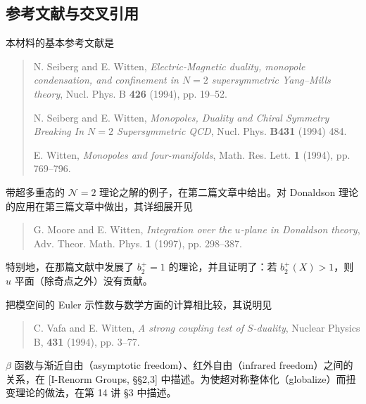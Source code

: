 
\subsection{参考文献与交叉引用}

本材料的基本参考文献是

\begin{quote}
N. Seiberg and E. Witten, \emph{Electric-Magnetic duality, monopole condensation, and confinement in $N=2$ supersymmetric Yang--Mills theory}, Nucl. Phys. B \textbf{426} (1994), pp. 19--52.

N. Seiberg and E. Witten, \emph{Monopoles, Duality and Chiral Symmetry Breaking In $N=2$ Supersymmetric QCD}, Nucl. Phys. \textbf{B431} (1994) 484.

E. Witten, \emph{Monopoles and four-manifolds}, Math. Res. Lett. \textbf{1} (1994), pp. 769--796.
\end{quote}

带超多重态的 $\mathcal{N}=2$ 理论之解的例子，在第二篇文章中给出。对 Donaldson 理论的应用在第三篇文章中做出，其详细展开见

\begin{quote}
G. Moore and E. Witten, \emph{Integration over the $u$-plane in Donaldson theory}, Adv. Theor. Math. Phys. \textbf{1} (1997), pp. 298--387.
\end{quote}

特别地，在那篇文献中发展了 $b_2^+=1$ 的理论，并且证明了：若 $b_2^+(X)>1$，则 $u$ 平面（除奇点之外）没有贡献。

把模空间的 Euler 示性数与数学方面的计算相比较，其说明见

\begin{quote}
C. Vafa and E. Witten, \emph{A strong coupling test of $S$-duality}, Nuclear Physics B, \textbf{431} (1994), pp. 3--77.
\end{quote}

$\beta$ 函数与渐近自由（asymptotic freedom）、红外自由（infrared freedom）之间的关系，在 [I-Renorm Groups, §§2,3] 中描述。为使超对称整体化（globalize）而扭变理论的做法，在第 14 讲 §3 中描述。


